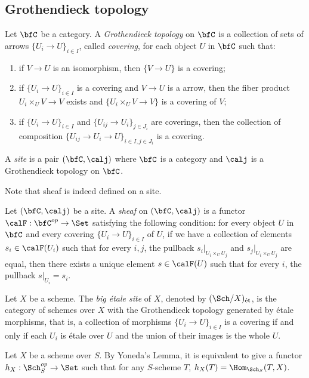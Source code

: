 \subsection{Grothendieck topology}

    \begin{definition}\label{def:Grothendieck_topology_and_site}
        Let \(\bfC\) be a category.
        A \emph{Grothendieck topology} on \(\bfC\) is a collection of sets of arrows \(\{U_i \to U\}_{i \in I}\), called \emph{covering}, for each object \(U\) in \(\bfC\) such that:
        \begin{enumerate}
            \item if \(V \to U\) is an isomorphism, then \(\{V \to U\}\) is a covering;
            \item if \(\{U_i \to U\}_{i \in I}\) is a covering and \(V \to U\) is a arrow, then the fiber product \(U_i \times_U V \to V\) exists and \(\{U_i \times_U V \to V\}\) is a covering of \(V\);
            \item if \(\{U_i \to U\}_{i \in I}\) and \(\{U_{ij} \to U_{i}\}_{j \in J_i}\) are coverings, then the collection of composition \(\{U_{ij} \to U_i \to U\}_{i\in I, j\in J_i}\) is a covering.
        \end{enumerate}
        A \emph{site} is a pair \((\bfC, \calj)\) where \(\bfC\) is a category and \(\calj\) is a Grothendieck topology on \(\bfC\).
    \end{definition}

    Note that sheaf is indeed defined on a site.

    \begin{definition}\label{def:sheaves_on_site}
        Let \((\bfC, \calj)\) be a site.
        A \emph{sheaf} on \((\bfC, \calj)\) is a functor \(\calF: \bfC^{op} \to \Set\) satisfying the following condition:
        for every object \(U\) in \(\bfC\) and every covering \(\{U_i \to U\}_{i \in I}\) of \(U\), 
        if we have a collection of elements \(s_i \in \calF(U_i)\) such that for every \(i,j\), 
        the pullback \(s_i|_{U_i \times_U U_j}\) and \(s_j|_{U_i \times_U U_j}\) are equal, 
        then there exists a unique element \(s \in \calF(U)\) such that for every \(i\), the pullback \(s|_{U_i} = s_i\).
    \end{definition}

    \begin{definition}\label{def:big_etale_site}
        Let \(X\) be a scheme.
        The \emph{big \'etale site} of \(X\), denoted by \((\Sch/X)_{\text{\'et}}\), is the category of schemes over \(X\) with the Grothendieck topology generated by \'etale morphisms,
        that is, a collection of morphisms \(\{U_i \to U\}_{i \in I}\) is a covering if and only if each \(U_i\) is \'etale over \(U\) and the union of their images is the whole \(U\).
    \end{definition}

    Let \(X\) be a scheme over \(S\).
    By Yoneda's Lemma, it is equivalent to give a functor \(h_X: \Sch_S^{op} \to \Set\) such that for any \(S\)-scheme \(T\), \(h_X(T) = \Hom_{\Sch_S}(T, X)\).
